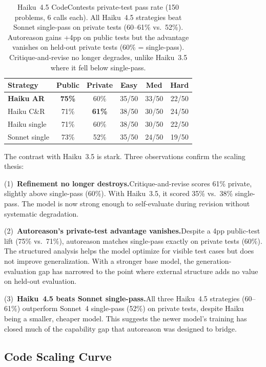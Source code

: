 \documentclass[11pt]{article}
\begin{document}
\begin{table}[H]
\centering
\small
\begin{tabular}{@{}lccccc@{}}
\toprule
\textbf{Strategy} & \textbf{Public} & \textbf{Private} & \textbf{Easy} & \textbf{Med} & \textbf{Hard} \\
\midrule
\rowcolor{TableShade}
\textbf{Haiku AR} & \textbf{75\%} & 60\% & 35/50 & 33/50 & 22/50 \\
Haiku C\&R & 71\% & \textbf{61\%} & 38/50 & 30/50 & 24/50 \\
\rowcolor{TableShade}
Haiku single & 71\% & 60\% & 38/50 & 30/50 & 22/50 \\
Sonnet single & 73\% & 52\% & 35/50 & 24/50 & 19/50 \\
\bottomrule
\end{tabular}
\caption{Haiku~4.5 CodeContests private-test pass rate (150 problems, 6 calls each). All Haiku~4.5 strategies beat Sonnet single-pass on private tests (60--61\% vs.\ 52\%). Autoreason gains +4pp on public tests but the advantage vanishes on held-out private tests (60\% = single-pass). Critique-and-revise no longer degrades, unlike Haiku~3.5 where it fell below single-pass.}
\label{tab:haiku45_code}
\end{table}

The contrast with Haiku~3.5 is stark. Three observations confirm the scaling thesis:

(1)~\textbf{Refinement no longer destroys.}\enspace Critique-and-revise scores 61\% private, slightly above single-pass (60\%). With Haiku~3.5, it scored 35\% vs.\ 38\% single-pass. The model is now strong enough to self-evaluate during revision without systematic degradation.

(2)~\textbf{Autoreason's private-test advantage vanishes.}\enspace Despite a 4pp public-test lift (75\% vs.\ 71\%), autoreason matches single-pass exactly on private tests (60\%). The structured analysis helps the model optimize for visible test cases but does not improve generalization. With a stronger base model, the generation-evaluation gap has narrowed to the point where external structure adds no value on held-out evaluation.

(3)~\textbf{Haiku~4.5 beats Sonnet single-pass.}\enspace All three Haiku~4.5 strategies (60--61\%) outperform Sonnet~4 single-pass (52\%) on private tests, despite Haiku being a smaller, cheaper model. This suggests the newer model's training has closed much of the capability gap that autoreason was designed to bridge.

\subsection{Code Scaling Curve}
\end{document}
